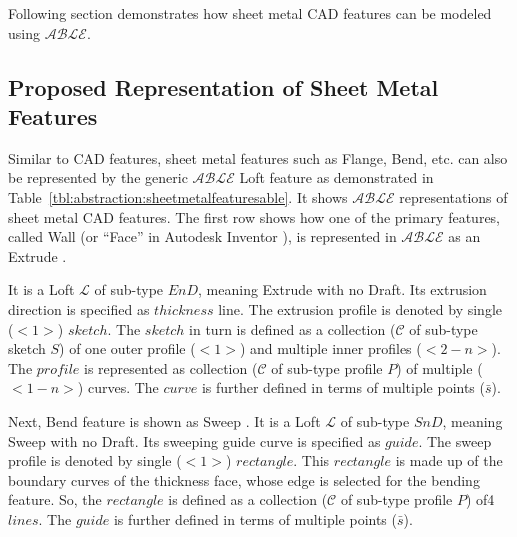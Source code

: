 


Following section demonstrates how sheet metal CAD features can be modeled using  $\mathcal{ABLE}$. 

\subsection{Proposed Representation of Sheet Metal Features}\label{sec:abstraction:sheetmetalfeaturesable}
Similar to CAD features, sheet metal features such as Flange, Bend, etc. can also be represented by the generic $\mathcal{ABLE}$ Loft feature as demonstrated in Table~\ref{tbl:abstraction:sheetmetalfeaturesable}. It shows $\mathcal{ABLE}$ representations of sheet metal CAD features.  The first row shows how one of the primary features, called Wall (or ``Face'' in Autodesk Inventor \cite{Inventor2014Help}), is represented in $\mathcal{ABLE}$ as an Extrude 
. 

It is a Loft $\mathcal{L}$ of sub-type $EnD$, meaning Extrude with no Draft. Its extrusion direction is specified as $thickness$ line. The extrusion profile is denoted by single ($<1>$) $sketch$. The $sketch$ in turn is defined as a collection ($\mathcal{C}$ of sub-type sketch $S$) of one outer profile ($<1>$) and multiple inner profiles ($<2-n>$). The $profile$ is represented as collection  ($\mathcal{C}$ of sub-type profile $P$) of multiple ($<1-n>$) curves. The $curve$ is further defined in terms of multiple points ($\bar{s}$).
 
Next, Bend feature is shown as Sweep . It is a Loft $\mathcal{L}$ of sub-type $SnD$, meaning Sweep with no Draft. Its sweeping guide curve is specified as $guide$. The sweep profile is denoted by single ($<1>$) $rectangle$. This $rectangle$  is made up of the boundary curves of the thickness face, whose edge is selected for the bending feature. So, the $rectangle$ is defined as a collection ($\mathcal{C}$ of sub-type profile $P$) of4 $lines$. The $guide$ is further defined in terms of multiple points ($\bar{s}$).

